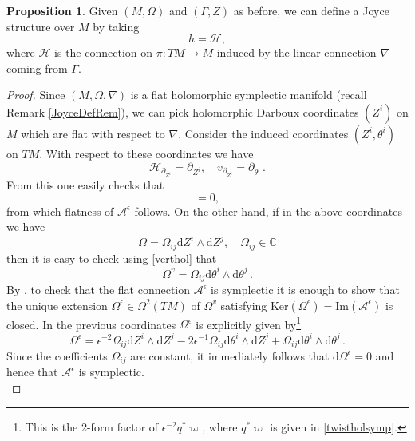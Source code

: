 \documentclass{article}
\theoremstyle{definition}
\newtheorem{proposition}[theorem]{Proposition}
\numberwithin{equation}{section}
\begin{document}
\begin{proposition}\label{trivJoyceStructure} Given $(M,\Omega)$ and $(\Gamma,Z)$ as before, we can define a Joyce structure over $M$ by taking
\begin{equation*}
h=\mathcal{H},
\end{equation*}
where $\mathcal{H}$ is the connection on $\pi:TM\to M$ induced by the linear connection $\nabla$ coming from $\Gamma$.

\begin{proof}
    Since $(M,\Omega,\nabla)$ is a flat holomorphic symplectic manifold (recall Remark \ref{JoyceDefRem}), we can pick holomorphic Darboux coordinates $(Z^i)$ on $M$ which are flat with respect to $\nabla$. Consider the induced coordinates $(Z^i,\theta^i)$ on $TM$. With respect to these coordinates we have
    \begin{equation*}
        \mathcal{H}_{\partial_{Z^i}}=\partial_{Z^i}, \quad v_{\partial_{Z^i}}=\partial_{\theta^i}\,.
    \end{equation*}
    From this one easily checks that 
    \begin{equation*}
    [\mathcal{A}^{\epsilon}_{\partial_{Z^i}},\mathcal{A}^{\epsilon}_{\partial_{Z^j}}]=0,
    \end{equation*}
    from which flatness of $\mathcal{A}^{\epsilon}$ follows. On the other hand, if in the above coordinates we have
    \begin{equation*}
        \Omega=\Omega_{ij}\mathrm{d}Z^i\wedge \mathrm{d}Z^j, \quad \Omega_{ij}\in \mathbb{C}
    \end{equation*}
    then it is easy to check using \eqref{verthol} that 
    \begin{equation*}
    \Omega^v=\Omega_{ij}\mathrm{d}\theta^i\wedge \mathrm{d}\theta^j\,.
    \end{equation*}
    By \cite[Lemma 2.3]{TwistorJoyce}, to check that the flat connection $\mathcal{A}^{\epsilon}$ is symplectic it is enough to show that the unique extension $\Omega^{\epsilon} \in \Omega^2(TM)$ of $\Omega^{v}$ satisfying $\text{Ker}(\Omega^{\epsilon})=\text{Im}(\mathcal{A}^{\epsilon})$ is closed. In the previous coordinates $\Omega^{\epsilon}$ is explicitly given by\footnote{This is the 2-form factor of $\epsilon^{-2}q^*\varpi$, where $q^*\varpi$ is given in \eqref{twistholsymp}.}
    \begin{equation}\label{twisttriv}
    \Omega^{\epsilon}=\epsilon^{-2}\Omega_{ij}\mathrm{d}Z^i\wedge \mathrm{d}Z^j - 2\epsilon^{-1}\Omega_{ij}\mathrm{d}\theta^i\wedge \mathrm{d}Z^j + \Omega_{ij}\mathrm{d}\theta^i\wedge \mathrm{d}\theta^j\,.
    \end{equation}
    Since the coefficients $\Omega_{ij}$ are constant, it immediately follows that $\mathrm{d}\Omega^{\epsilon}=0$ and hence that $\mathcal{A}^{\epsilon}$ is symplectic. \\


\end{proof}
\end{proposition}
\end{document}
